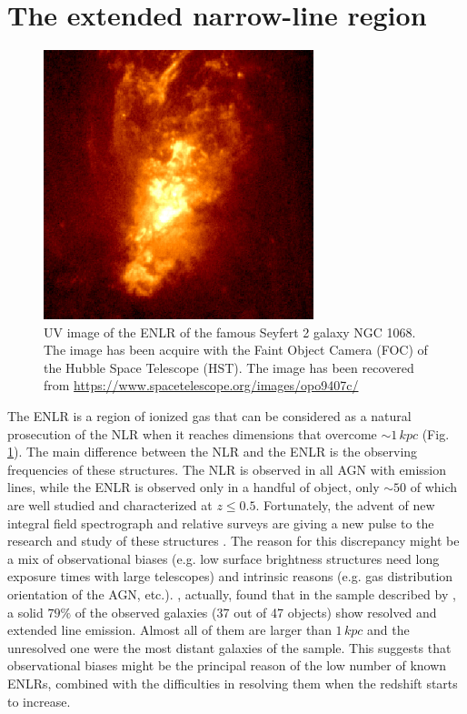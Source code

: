 \documentclass[../main.tex]{subfiles}
\begin{document}
\section{The extended narrow-line region}
\label{sec:ENLR}

\begin{figure}
\centering
\includegraphics[width=0.7\textwidth]{PhD_thesis/images/opo9407c.jpg} 
\caption[]{UV image of the ENLR of the famous Seyfert 2 galaxy NGC 1068. The image has been acquire with the Faint Object Camera (FOC) of the Hubble Space Telescope (HST). The image has been recovered from \url{https://www.spacetelescope.org/images/opo9407c/}}
\label{fig:NGC1068}
\end{figure}

The ENLR is a region of ionized gas that can be considered as a natural prosecution of the NLR when it reaches dimensions that overcome $\sim 1\,\si{kpc}$ (Fig.\,\ref{fig:NGC1068}).
The main difference between the NLR and the ENLR is the observing frequencies of these structures.
The NLR is observed in all AGN with emission lines, while the ENLR is observed only in a handful of object,
only $\sim50$ of which are well studied and characterized at $z\le0.5$.
Fortunately, the advent of new integral field spectrograph and relative surveys \citep[e.g. MaNGA][]{Bundy15} are giving a new pulse to the research and study of these structures \citep{Husemann14,He18}.
The reason for this discrepancy might be a mix of observational biases (e.g. low surface brightness structures need long exposure times with large telescopes) and intrinsic reasons (e.g. gas distribution orientation of the AGN, etc.).
\citet{Mulchaey96b}, actually, found that in the sample described by \citet{Mulchaey96a}, a solid $79\%$ of the observed galaxies (37 out of 47 objects) show resolved and extended line emission. 
Almost all of them are larger than $1\,\si{kpc}$ and the unresolved one were the most distant galaxies of the sample.
This suggests that observational biases might be the principal reason of the low number of known ENLRs, combined with the difficulties in resolving them when the redshift starts to increase. 
\end{document}

